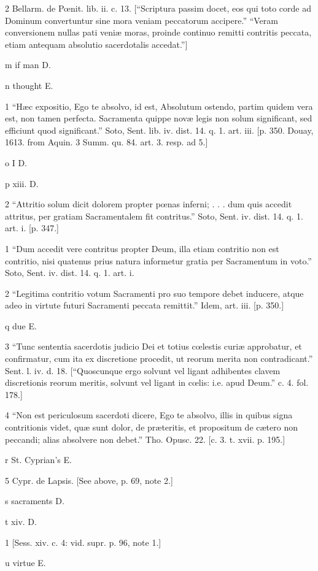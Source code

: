 2
Bellarm. de Pœnit. lib. ii. c. 13. [“Scriptura passim docet, eos qui toto corde ad Dominum convertuntur sine mora veniam peccatorum accipere.” “Veram conversionem nullas pati veniæ moras, proinde continuo remitti contritis peccata, etiam antequam absolutio sacerdotalis accedat.”]

m
if man D.

n
thought E.

1
“Hæc expositio, Ego te absolvo, id est, Absolutum ostendo, partim quidem vera est, non tamen perfecta. Sacramenta quippe novæ legis non solum significant, sed efficiunt quod significant.” Soto, Sent. lib. iv. dist. 14. q. 1. art. iii. [p. 350. Douay, 1613. from Aquin. 3 Summ. qu. 84. art. 3. resp. ad 5.]

o
I D.

p
xiii. D.

2
“Attritio solum dicit dolorem propter pœnas inferni; . . . dum quis accedit attritus, per gratiam Sacramentalem fit contritus.” Soto, Sent. iv. dist. 14. q. 1. art. i. [p. 347.]

1
“Dum accedit vere contritus propter Deum, illa etiam contritio non est contritio, nisi quatenus prius natura informetur gratia per Sacramentum in voto.” Soto, Sent. iv. dist. 14. q. 1. art. i.

2
“Legitima contritio votum Sacramenti pro suo tempore debet inducere, atque adeo in virtute futuri Sacramenti peccata remittit.” Idem, art. iii. [p. 350.]

q
due E.

3
“Tunc sententia sacerdotis judicio Dei et totius cœlestis curiæ approbatur, et confirmatur, cum ita ex discretione procedit, ut reorum merita non contradicant.” Sent. l. iv. d. 18. [“Quoscunque ergo solvunt vel ligant adhibentes clavem discretionis reorum meritis, solvunt vel ligant in cœlis: i.e. apud Deum.” c. 4. fol. 178.]

4
“Non est periculosum sacerdoti dicere, Ego te absolvo, illis in quibus signa contritionis videt, quæ sunt dolor, de præteritis, et propositum de cætero non peccandi; alias absolvere non debet.” Tho. Opusc. 22. [c. 3. t. xvii. p. 195.]

r
St. Cyprian’s E.

5
Cypr. de Lapsis. [See above, p. 69, note 2.]

s
sacraments D.

t
xiv. D.

1
[Sess. xiv. c. 4: vid. supr. p. 96, note 1.]

u
virtue E.

